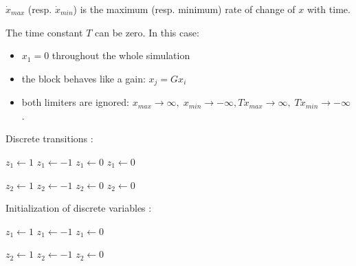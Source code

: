 \vspace{2ex}
$\dot{x}_{max}$ (resp. $\dot{x}_{min}$) is the maximum (resp. minimum) rate of change of $x$ with time.

The time constant $T$ can be zero. In this case:
\begin{itemize}
\item $x_1=0$ throughout the whole simulation
\item the block behaves like a gain: $x_j = G x_i$
\item both limiters are ignored: $x_{max} \rightarrow \infty, \; x_{min} \rightarrow -\infty, T \dot{x}_{max} \rightarrow \infty, \; T \dot{x}_{min} \rightarrow -\infty$.
\end{itemize}

Discrete transitions : 

\hspace*{20ex}\begin{minipage}[t]{6cm}
\begin{algorithmic} 
    \STATE $z_1 \gets 1$
    \STATE $z_1 \gets -1$
  \ENDIF
{}
    \STATE $z_1 \gets 0$
  \ENDIF
{}
    \STATE $z_1 \gets 0$
  \ENDIF
\ENDIF
\end{algorithmic}
\begin{algorithmic} 
    \STATE $z_2 \gets 1$
    \STATE $z_2 \gets -1$
  \ENDIF
{}
    \STATE $z_2 \gets 0$
  \ENDIF
{}
    \STATE $z_2 \gets 0$
  \ENDIF
\ENDIF
\end{algorithmic}
\end{minipage}

\pagebreak
Initialization of discrete variables :

\hspace*{20ex}\begin{minipage}[t]{15cm}
\begin{algorithmic} 
   \STATE $z_1 \gets 1$
   \STATE $z_1 \gets -1$
\ELSE
   \STATE $z_1 \gets 0$
\ENDIF
\end{algorithmic}
\begin{algorithmic} 
   \STATE $z_2 \gets 1$
   \STATE $z_2 \gets -1$
\ELSE
   \STATE $z_2 \gets 0$
\ENDIF
\end{algorithmic}
\end{minipage}